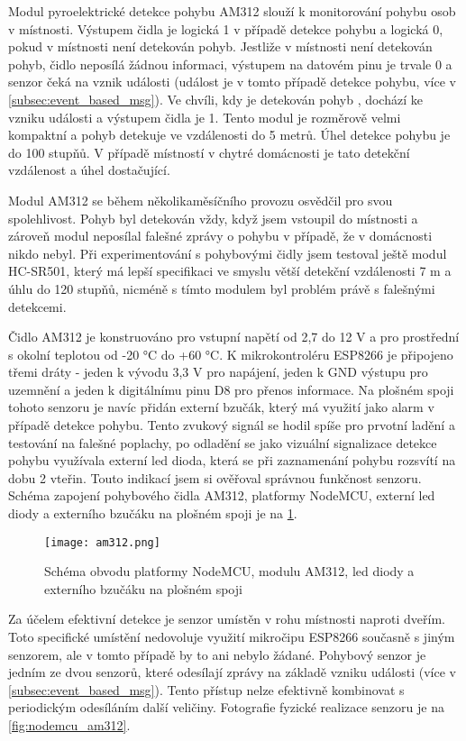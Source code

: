 Modul pyroelektrické detekce pohybu AM312 slouží k monitorování pohybu osob v místnosti. Výstupem čidla je logická 1 v případě detekce pohybu a logická 0, pokud v místnosti není detekován pohyb. Jestliže v místnosti není detekován pohyb, čidlo neposílá žádnou informaci, výstupem na datovém pinu je trvale 0 a senzor čeká na vznik události (událost je v tomto případě detekce pohybu, více v \cref{subsec:event_based_msg}). Ve chvíli, kdy je detekován pohyb , dochází ke vzniku události a výstupem čidla je 1. Tento modul je rozměrově velmi kompaktní a pohyb detekuje ve vzdálenosti do 5 metrů. Úhel detekce pohybu je do 100 stupňů. V případě místností v chytré domácnosti je tato detekční vzdálenost a úhel dostačující. \par 
Modul AM312 se během několikaměsíčního provozu osvědčil pro svou spolehlivost. Pohyb byl detekován vždy, když jsem vstoupil do místnosti a zároveň modul neposílal falešné zprávy o pohybu v případě, že v domácnosti nikdo nebyl. Při experimentování s pohybovými čidly jsem testoval ještě modul HC-SR501, který má lepší specifikaci ve smyslu větší detekční vzdálenosti 7 m a úhlu do 120 stupňů, nicméně s tímto modulem byl problém právě s falešnými detekcemi. \par
Čidlo AM312 je konstruováno pro vstupní napětí od 2,7 do 12 V a pro prostřední s okolní teplotou od -20 \si{\degree}C do +60 \si{\degree}C. K mikrokontroléru ESP8266 je připojeno třemi dráty - jeden k vývodu 3,3 V pro napájení, jeden k GND výstupu pro uzemnění a jeden k digitálnímu pinu D8 pro přenos informace. Na plošném spoji tohoto senzoru je navíc přidán externí bzučák, který má využití jako alarm v případě detekce pohybu. Tento zvukový signál se hodil spíše pro prvotní ladění a testování na falešné poplachy, po odladění se jako vizuální signalizace detekce pohybu využívala externí led dioda, která se při zaznamenání pohybu rozsvítí na dobu 2 vteřin. Touto indikací jsem si ověřoval správnou funkčnost senzoru. Schéma zapojení pohybového čidla AM312, platformy NodeMCU, externí led diody a externího bzučáku na plošném spoji je na \cref{fig:schema_esp_am312}. 

\begin{figure}[H]
  \centering
  \texttt{[image: am312.png]}
  \caption{Schéma obvodu platformy NodeMCU, modulu AM312, led diody a externího bzučáku na plošném spoji}
  \label{fig:schema_esp_am312}
\end{figure}

Za účelem efektivní detekce je senzor umístěn v rohu místnosti naproti dveřím. Toto specifické umístění nedovoluje využití mikročipu ESP8266 současně s jiným senzorem, ale v tomto případě by to ani nebylo žádané. Pohybový senzor je jedním ze dvou senzorů, které odesílají zprávy na základě vzniku události (více v \cref{subsec:event_based_msg}). Tento přístup nelze efektivně kombinovat s periodickým odesíláním další veličiny. Fotografie fyzické realizace senzoru je na \cref{fig:nodemcu_am312}.

